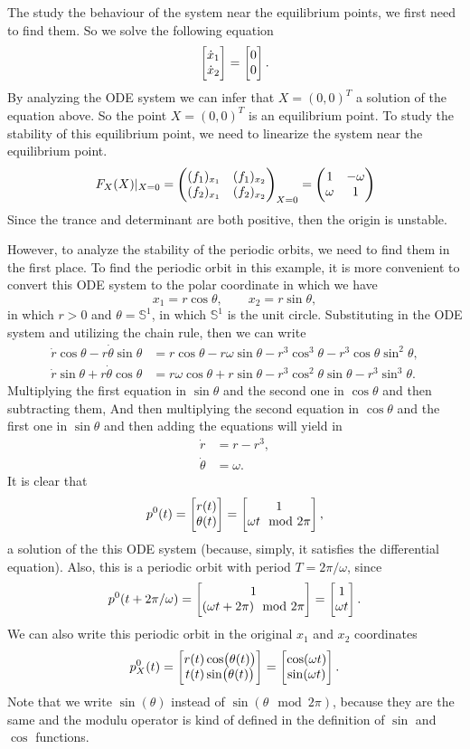 	\begin{ans}
	The study the behaviour of the system near the equilibrium points, we first need to find them. So we solve the following equation
	\[ \begin{bmatrix} \dot{x}_1 \\ \dot{x}_2 \end{bmatrix} = \begin{bmatrix} 0 \\ 0 \end{bmatrix}. \]
	By analyzing the ODE system we can infer that $X=(0,0)^T$ a solution of the equation above. So the point $X=(0,0)^T$ is an equilibrium point. To study the stability of this equilibrium point, we need to linearize the system near the equilibrium point. 
	\[ F_X(X)|_{X=0} = \begin{pmatrix} (f_1)_{x_1} & (f_1)_{x_2} \\ (f_2)_{x_1} & (f_2)_{x_2} \end{pmatrix}_{X=0} = \begin{pmatrix} 1 & -\omega \\ \omega & 1 \end{pmatrix}\]
	Since the trance and determinant are both positive, then the origin is unstable.
	
	However, to analyze the stability of the periodic orbits, we need to find them in the first place. To find the periodic orbit in this example, it is more convenient to convert this ODE system to the polar coordinate in which we have
	\[ x_1 = r \cos\theta, \qquad x_2 = r \sin\theta, \]
	in which $r>0$ and $\theta = \mathbb{S}^1$, in which $\mathbb{S}^1$ is the unit circle. Substituting in the ODE system and utilizing the chain rule, then we can write
	\begin{align*}
		\dot{r}\cos\theta - r\dot{\theta}\sin\theta &= r\cos\theta - r\omega\sin\theta - r^3\cos^3\theta - r^3\cos\theta\sin^2\theta, \\
		\dot{r}\sin\theta + r\dot{\theta}\cos\theta &= r\omega\cos\theta + r\sin\theta - r^3\cos^2\theta\sin\theta - r^3\sin^3\theta.
	\end{align*}
	Multiplying the first equation in $\sin\theta$ and the second one in  $\cos\theta$ and then subtracting them, And then multiplying the second equation in $\cos\theta$ and the first one in $\sin\theta$ and then adding the equations will yield in
	\begin{align*}
		\dot{r} &= r - r^3,\\
		\dot{\theta} &= \omega.
	\end{align*}
	It is clear that
	\[ p^0(t) = \begin{bmatrix} r(t) \\ \theta(t) \end{bmatrix} = \begin{bmatrix} 1 \\ \omega t \mod2\pi \end{bmatrix}, \]
	a solution of the this ODE system (because, simply, it satisfies the differential equation). Also, this is a periodic orbit with period $T = 2\pi/\omega$, since
	\[ p^0(t+2\pi/\omega) = \begin{bmatrix} 1 \\ (\omega t + 2\pi)\mod2\pi \end{bmatrix} = \begin{bmatrix} 1 \\ \omega t \end{bmatrix}. \]
	We can also write this periodic orbit in the original $x_1$ and $x_2$ coordinates
	\begin{align*}
		p_X^0(t) = \begin{bmatrix} r(t)\cos(\theta(t)) \\ t(t)\sin(\theta(t)) \end{bmatrix} = \begin{bmatrix} \cos(\omega t) \\ \sin(\omega t) \end{bmatrix}.
	\end{align*}		
	Note that we write $\sin(\theta)$ instead of $\sin(\theta \mod2\pi)$, because they are the same and the modulu operator is kind of defined in the definition of $\sin$ and $\cos$ functions. 
	

\end{ans}
